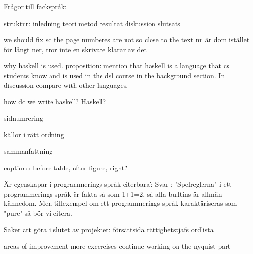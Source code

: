 Frågor till fackspråk:



struktur:
inledning
teori
metod
resultat
diskussion
slutsats



we should fix so the page numberes are not so close to the text nu är dom istället för långt ner, tror inte en skrivare klarar av det

why haskell is used.
proposition: mention that haskell is a language that cs students know and is used in the dsl course in the background section. In discussion compare with other languages.

how do we write haskell? Haskell?


sidnumrering

källor i rätt ordning

sammanfattning

captions: before table, after figure, right? 

Är egenskapar i programmerings språk citerbara?
Svar : "Spelreglerna" i ett programmerings språk är fakta så som 1+1=2, så alla builtins är allmän kännedom. Men tillexempel om ett programmerings språk karaktäriseras som "pure" så bör vi citera. 

Saker att göra i slutet av projektet:
försättsida
rättighetstjafs
ordlista

areas of improvement
more excercises
continue working on the nyquist part
